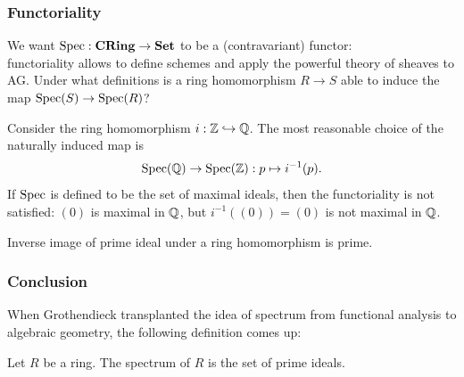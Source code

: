 \documentclass[10pt]{beamer}
\begin{document}
\begin{frame}
\frametitle{Functoriality}
  We want $\Spec:\cat{CRing}\to\cat{Set}$ to be a (contravariant) functor:\\
  functoriality allows to define schemes and apply the powerful theory of sheaves to AG.
  \pause Under what definitions is a ring homomorphism $R\to S$ able to induce the map $\Spec(S)\to\Spec(R)$? \pause
  \begin{ex}
    Consider the ring homomorphism $i:\mathbb{Z}\hookrightarrow\mathbb{Q}$.
    The most reasonable choice of the naturally induced map is
    \[\Spec(\Q)\to\Spec(\Z):p\mapsto i^{-1}(p).\]
    \pause If $\operatorname{Spec}$ is defined to be the set of maximal ideals, then the functoriality is not satisfied: $(0)$ is maximal in $\mathbb{Q}$, but $i^{-1}((0))=(0)$ is not maximal in $\mathbb{Q}$.
  \end{ex}
  \pause
  \begin{prop}
    Inverse image of prime ideal under a ring homomorphism is prime.
  \end{prop}
\end{frame}

\begin{frame}
\frametitle{Conclusion}
  When Grothendieck transplanted the idea of spectrum from functional analysis to algebraic geometry, the following definition comes up:
  \begin{defn}
    Let $R$ be a ring.
    The spectrum of $R$ is the set of prime ideals.
  \end{defn}
\end{frame}
\end{document}
